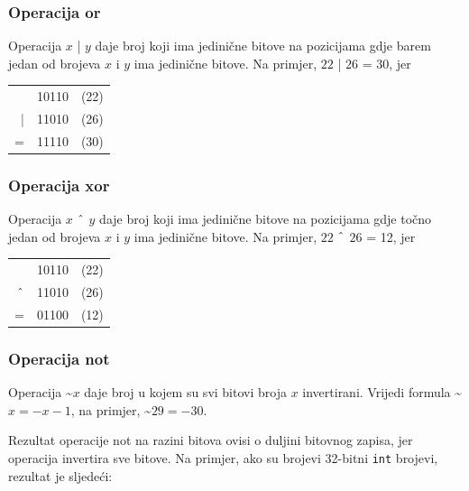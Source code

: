 \subsubsection{Operacija or}


Operacija  $x$ | $y$ daje broj
koji ima jedinične bitove na pozicijama gdje barem jedan
od brojeva $x$ i $y$ ima jedinične bitove.
Na primjer, $22$ | $26$ = 30, jer

\begin{center}
\begin{tabular}{rrr}
& 10110 & (22)\\
| & 11010 & (26) \\
\hline
 = & 11110 & (30) \\
\end{tabular}
\end{center}

\subsubsection{Operacija xor}


Operacija  $x$ $\XOR$ $y$ daje broj
koji ima jedinične bitove na pozicijama gdje točno jedan
od brojeva $x$ i $y$ ima jedinične bitove.
Na primjer, $22$ $\XOR$ $26$ = 12, jer

\begin{center}
\begin{tabular}{rrr}
& 10110 & (22)\\
$\XOR$ & 11010 & (26) \\
\hline
 = & 01100 & (12) \\
\end{tabular}
\end{center}

\subsubsection{Operacija not}


Operacija  \textasciitilde$x$
daje broj u kojem su svi bitovi broja $x$
invertirani.
Vrijedi formula \textasciitilde$x = -x-1$,
na primjer, \textasciitilde$29 = -30$.

Rezultat operacije not na razini bitova
ovisi o duljini bitovnog zapisa,
jer operacija invertira sve bitove.
Na primjer, ako su brojevi 32-bitni
\texttt{int} brojevi, rezultat je sljedeći:

